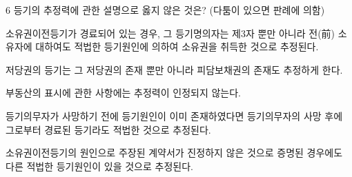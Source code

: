 \begin{question}{6}
등기의 추정력에 관한 설명으로 옳지 않은 것은? (다툼이 있으면 판례에 의함)
\begin{choices}
  \item 소유권이전등기가 경료되어 있는 경우, 그 등기명의자는 제3자 뿐만 아니라 전(前) 소유자에 대하여도 적법한 등기원인에 의하여 소유권을 취득한 것으로 추정된다.
  \item 저당권의 등기는 그 저당권의 존재 뿐만 아니라 피담보채권의 존재도 추정하게 한다.
  \item 부동산의 표시에 관한 사항에는 추정력이 인정되지 않는다.
  \item 등기의무자가 사망하기 전에 등기원인이 이미 존재하였다면 등기의무자의 사망 후에 그로부터 경료된 등기라도 적법한 것으로 추정된다.
  \item 소유권이전등기의 원인으로 주장된 계약서가 진정하지 않은 것으로 증명된 경우에도 다른 적법한 등기원인이 있을 것으로 추정된다.
\end{choices}
\end{question}

